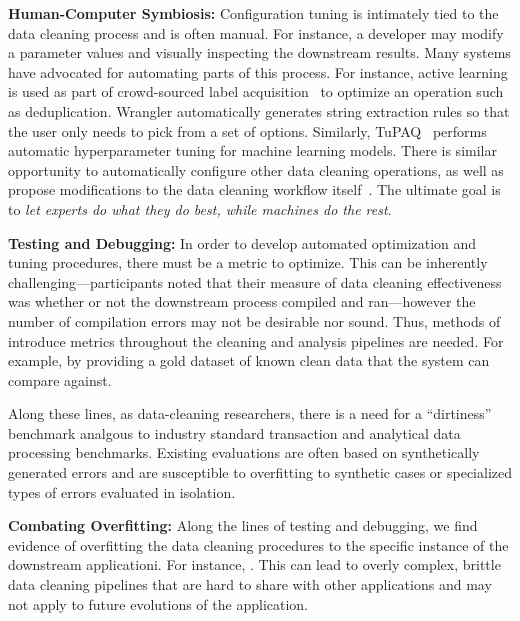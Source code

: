 \noindent\textbf{Human-Computer Symbiosis:}  Configuration tuning is intimately tied to the data cleaning process and is often manual.  For instance, a developer may modify a parameter values and visually inspecting the downstream results.  Many systems have advocated for automating parts of this process.  For instance, active learning is used as part of crowd-sourced label acquisition~\cite{gokhale2014corleone,DBLP:journals/pvldb/HaasW0F15} to optimize an operation such as deduplication.  Wrangler automatically generates string extraction rules so that the user only needs to pick from a set of options.  Similarly, TuPAQ~\cite{sparks2015automating} performs automatic hyperparameter tuning for machine learning models.   There is similar opportunity to automatically configure other data cleaning operations, as well as propose modifications to the data cleaning workflow itself~\cite{wisteria}.  The ultimate goal is to {\it let experts do what they do best, while machines do the rest}.


\noindent\textbf{Testing and Debugging:} In order to develop automated optimization and tuning procedures, there must be a metric to optimize.  This can be inherently challenging---participants noted that their measure of data cleaning effectiveness was whether or not the downstream process compiled and ran---however the number of compilation errors may not be desirable nor sound.  Thus, methods of introduce metrics throughout the cleaning and analysis pipelines are needed.  For example, by providing a gold dataset of known clean data that the system can compare against.  

Along these lines, as data-cleaning researchers, there is a need for a ``dirtiness'' benchmark analgous to industry standard transaction and analytical data processing benchmarks.  Existing evaluations are often based on synthetically generated errors and are susceptible to overfitting to synthetic cases or specialized types of errors evaluated in isolation.  


\noindent\textbf{Combating Overfitting:} Along the lines of testing and debugging, we find evidence of overfitting the data cleaning procedures to the specific instance of the downstream applicationi.  For instance, {\color{red}{EXAMPLE}}.  This can lead to overly complex, brittle data cleaning pipelines that are hard to share with other applications and may not apply to future evolutions of the application.  {\color{red}{APPLY SANJAY}}

